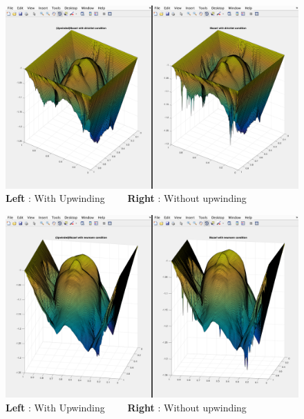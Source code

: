 \documentclass[11pt]{report}
\begin{document}
	\begin{figure}[h!]
		\centering
			\includegraphics[width = 14cm, height = 7cm]{Compare_dir.png}
			\caption{\textbf{Left} : With Upwinding $\;\;\;\;\;\;$ \textbf{Right} : Without upwinding}
			\label{fig:5}
	\end{figure}
	
		\begin{figure}[h!]
			\centering
			\includegraphics[width = 14cm, height = 7cm]{comapre_newm.png}
			\caption{\textbf{Left} : With Upwinding $\;\;\;\;\;\;$ \textbf{Right} : Without upwinding}
			\label{fig:6}
		\end{figure}
	
	
\end{document}
